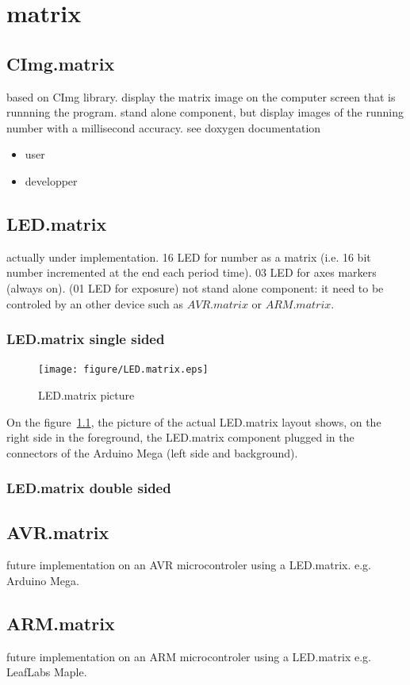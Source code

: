 \documentclass[10pt,a4paper]{report}
\begin{document}
\chapter{matrix}
\section{CImg.matrix}\label{CImg.matrix} 
based on CImg library.
display the matrix image on the computer screen that is runnning the program.
stand alone component, but display images of the running number with a millisecond accuracy.
see doxygen documentation
\begin{itemize}
\item user
\item developper
\end{itemize}
\section{LED.matrix}\label{LED.matrix} 
actually under implementation.
16 LED for number as a matrix (i.e. 16 bit number incremented at the end each period time).
03 LED for axes markers (always on).
(01 LED for exposure)
not stand alone component: it need to be controled by an other device such as $AVR.matrix$ or $ARM.matrix$.
\subsection{LED.matrix single sided}
\begin{figure}
  \texttt{[image: figure/LED.matrix.eps]}
  \caption{LED.matrix picture}
  \label{fig:LED_matrix_picture}
\end{figure}
On the figure~\ref{fig:LED_matrix_picture}, the picture of the actual LED.matrix layout shows, on the right side in the foreground, the LED.matrix component plugged in the connectors of the Arduino Mega (left side and background).
\subsection{LED.matrix double sided}
\section{AVR.matrix}
future implementation on an AVR microcontroler using a LED.matrix.
e.g. Arduino Mega.
\section{ARM.matrix}
future implementation on an ARM microcontroler using a LED.matrix
e.g. LeafLabs Maple.
\end{document}
